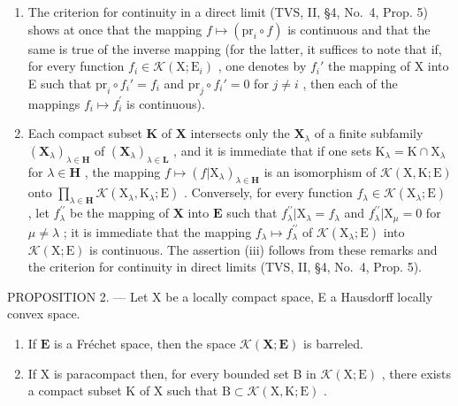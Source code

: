 \begin{enumerate}
\item
  The criterion for continuity in a direct limit (TVS, II, §4, No.~4, Prop. 5) shows at once that the mapping \(f \mapsto (\mathrm{pr}_i \circ f)\) is continuous and that the same is true of the inverse mapping (for the latter, it suffices to note that if, for every function \(f_i \in \mathcal{K}(\mathrm{X};\mathrm{E}_i)\) , one denotes by \(f_i'\) the mapping of X into E such that \(\mathrm{pr}_i\circ f_i' = f_i\) and \(\mathrm{pr}_j\circ f_i' = 0\) for \(j\neq i\) , then each of the mappings \(f_{i}\mapsto f_{i}^{\prime}\) is continuous).
\item
  Each compact subset \(\mathbf{K}\) of \(\mathbf{X}\) intersects only the \(\mathbf{X}_{\lambda}\) of a finite subfamily \((\mathbf{X}_{\lambda})_{\lambda \in \mathbf{H}}\) of \((\mathbf{X}_{\lambda})_{\lambda \in \mathbf{L}}\) , and it is immediate that if one sets \(\mathrm{K}_{\lambda} = \mathrm{K} \cap \mathrm{X}_{\lambda}\) for \(\lambda \in \mathbf{H}\) , the mapping \(f \mapsto (f|\mathrm{X}_{\lambda})_{\lambda \in \mathbf{H}}\) is an isomorphism of \(\mathcal{K}(\mathrm{X},\mathrm{K};\mathrm{E})\) onto \(\prod_{\lambda \in \mathbf{H}} \mathcal{K}(\mathrm{X}_{\lambda},\mathrm{K}_{\lambda};\mathrm{E})\) . Conversely, for every function \(f_{\lambda} \in \mathcal{K}(\mathrm{X}_{\lambda};\mathrm{E})\) , let \(f_{\lambda}^{\prime \prime}\) be the mapping of \(\mathbf{X}\) into \(\mathbf{E}\) such that \(f_{\lambda}^{\prime \prime}|\mathrm{X}_{\lambda} = f_{\lambda}\) and \(f_{\lambda}^{\prime \prime}|\mathrm{X}_{\mu} = 0\) for \(\mu \neq \lambda\) ; it is immediate that the mapping \(f_{\lambda} \mapsto f_{\lambda}^{\prime \prime}\) of \(\mathcal{K}(\mathrm{X}_{\lambda};\mathrm{E})\) into \(\mathcal{K}(\mathrm{X};\mathrm{E})\) is continuous. The assertion (iii) follows from these remarks and the criterion for continuity in direct limits (TVS, II, §4, No.~4, Prop. 5).
\end{enumerate}

PROPOSITION 2. --- Let X be a locally compact space, E a Hausdorff locally convex space.

\begin{enumerate}
\def\labelenumi{(\roman{enumi})}
\item
  If \(\mathbf{E}\) is a Fréchet space, then the space \(\mathcal{K}(\mathbf{X};\mathbf{E})\) is barreled.
\item
  If X is paracompact then, for every bounded set B in \(\mathcal{K}(\mathrm{X};\mathrm{E})\) , there exists a compact subset K of X such that \(\mathrm{B}\subset \mathcal{K}(\mathrm{X},\mathrm{K};\mathrm{E})\) .
\end{enumerate}

